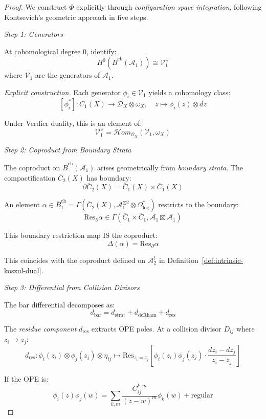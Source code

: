 \begin{proof}
We construct $\Phi$ explicitly through \emph{configuration space integration}, following Kontsevich's geometric approach in five steps.

\medskip
\noindent\emph{Step 1: Generators}

At cohomological degree 0, identify:
\[H^0(\bar{B}^{\text{ch}}(\mathcal{A}_1)) \cong \mathcal{V}_1^{\vee}\]
where $\mathcal{V}_1$ are the generators of $\mathcal{A}_1$.

\emph{Explicit construction.} Each generator $\phi_i \in \mathcal{V}_1$ yields a cohomology class:
\[[\phi_i^*]: \overline{C}_1(X) \to \mathcal{D}_X \otimes \omega_X, \quad z \mapsto \phi_i(z) \otimes dz\]

Under Verdier duality, this is an element of:
\[\mathcal{V}_1^{\vee} = \mathcal{H}om_{\mathcal{O}_X}(\mathcal{V}_1, \omega_X)\]

\medskip
\noindent\emph{Step 2: Coproduct from Boundary Strata}

The coproduct on $\bar{B}^{\text{ch}}(\mathcal{A}_1)$ arises geometrically from \emph{boundary strata}. The compactification $\overline{C}_2(X)$ has boundary:
\[\partial \overline{C}_2(X) = \overline{C}_1(X) \times \overline{C}_1(X)\]

An element $\alpha \in \bar{B}_1^{\text{ch}} = \Gamma(\overline{C}_2(X), \mathcal{A}_1^{\boxtimes 2} \otimes \Omega^*_{\log})$ restricts to the boundary:
\[\text{Res}_{\partial} \alpha \in \Gamma(\overline{C}_1 \times \overline{C}_1, \mathcal{A}_1 \boxtimes \mathcal{A}_1)\]

This boundary restriction map IS the coproduct:
\[\Delta(\alpha) = \text{Res}_{\partial} \alpha\]

This coincides with the coproduct defined on $\mathcal{A}_2^!$ in Definition~\ref{def:intrinsic-koszul-dual}.

\medskip
\noindent\emph{Step 3: Differential from Collision Divisors}

The bar differential decomposes as:
\[d_{\text{bar}} = d_{\text{strat}} + d_{\text{deRham}} + d_{\text{res}}\]

The \emph{residue component} $d_{\text{res}}$ extracts OPE poles. At a collision divisor $D_{ij}$ where $z_i \to z_j$:
\[d_{\text{res}}: \phi_i(z_i) \otimes \phi_j(z_j) \otimes \eta_{ij} \mapsto \text{Res}_{z_i=z_j}\left[\phi_i(z_i)\phi_j(z_j) \cdot \frac{dz_i - dz_j}{z_i - z_j}\right]\]

If the OPE is:
\[\phi_i(z)\phi_j(w) = \sum_{k,m} \frac{C_{ij}^{k,m}}{(z-w)^m} \phi_k(w) + \text{regular}\]


\end{proof}
